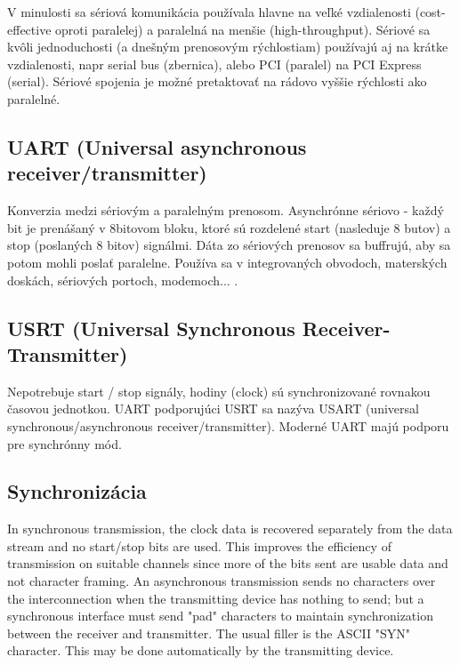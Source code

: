 \documentclass[10pt,a4paper]{article}
\begin{document}
V minulosti sa sériová komunikácia používala hlavne na veľké vzdialenosti (cost-effective oproti paralelej) 
a paralelná na menšie (high-throughput). 
Sériové sa kvôli jednoduchosti (a dnešným prenosovým rýchlostiam) používajú aj na krátke vzdialenosti, napr serial bus (zbernica), alebo PCI (paralel) na PCI Express (serial). 
Sériové spojenia je možné pretaktovať na rádovo vyššie rýchlosti ako paralelné.  

\subsection{UART (Universal asynchronous receiver/transmitter)} 

Konverzia medzi sériovým a paralelným prenosom.
Asynchrónne sériovo - každý bit je prenášaný v 8bitovom bloku, ktoré sú rozdelené start (nasleduje 8 butov) a stop (poslaných 8 bitov) signálmi.
Dáta zo sériových prenosov sa buffrujú, aby sa potom mohli poslať paralelne. 
Používa sa v integrovaných obvodoch, materských doskách, sériových portoch, modemoch... .       
       
\subsection{USRT (Universal Synchronous Receiver-Transmitter)}   

Nepotrebuje start / stop signály, hodiny (clock) sú synchronizované rovnakou časovou jednotkou.
UART podporujúci USRT sa nazýva USART (universal synchronous/asynchronous receiver/transmitter).
Moderné UART majú podporu pre synchrónny mód. 
  
\subsection{Synchronizácia}   
In synchronous transmission, the clock data is recovered separately from the data stream and no start/stop bits are used. This improves the efficiency of transmission on suitable channels since more of the bits sent are usable data and not character framing. An asynchronous transmission sends no characters over the interconnection when the transmitting device has nothing to send; but a synchronous interface must send "pad" characters to maintain synchronization between the receiver and transmitter. The usual filler is the ASCII "SYN" character. This may be done automatically by the transmitting device.
\end{document}
